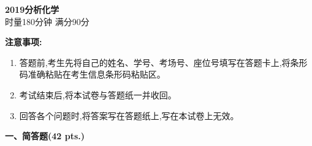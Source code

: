 \begin{center}
    {\LARGE \textbf{2019分析化学}} \\[2ex]
    {\large 时量180分钟 \quad 满分90分}
\end{center}

\vspace{0.5cm}
\noindent\textbf{注意事项:}
\begin{enumerate}[label=\arabic*., parsep=0pt, itemsep=0pt]
    \item 答题前,考生先将自己的姓名、学号、考场号、座位号填写在答题卡上,将条形码准确粘贴在考生信息条形码粘贴区。
    \item 考试结束后,将本试卷与答题纸一并收回。
    \item 回答各个问题时,将答案写在答题纸上,写在本试卷上无效。
\end{enumerate}

\vspace{0.5cm}
\noindent\textbf{一、简答题(42 pts.)}

